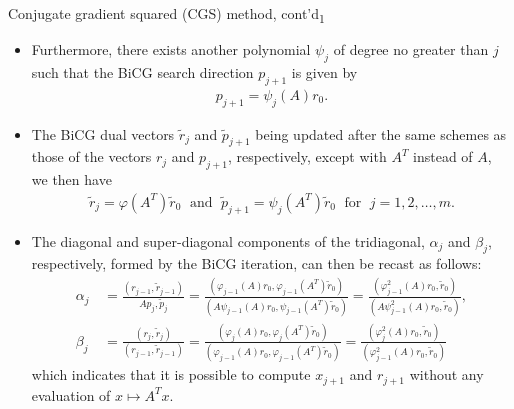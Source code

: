 \documentclass[t,usepdftitle=false]{beamer}
\begin{document}
\begin{frame}{Conjugate gradient squared (CGS) method, cont'd\textsubscript{1}}
\begin{itemize}
\item Furthermore, there exists another polynomial $\psi_j$ of degree no greater than $j$ such that the BiCG search direction $p_{j+1}$ is given by\vspace{-.1cm}
\begin{align*}
p_{j+1}=\psi_j(A)r_0.
\end{align*}
\item The BiCG dual vectors $\tilde{r}_j$ and $\tilde{p}_{j+1}$ being updated after the same schemes as those of the vectors $r_j$ and $p_{j+1}$, respectively, except with $A^T$ instead of $A$, we then have\vspace{-.1cm}
\begin{align*}
\tilde{r}_j=\varphi(A^T)\tilde{r}_0
\;\text{ and }\;
\tilde{p}_{j+1}=\psi_j(A^T)\tilde{r}_0
\;\text{ for }\;
j=1,2,\dots,m.
\end{align*}
\item The diagonal and super-diagonal components of the tridiagonal, $\alpha_j$ and $\beta_j$, respectively, formed by the BiCG iteration, can then be recast as follows:\vspace{-.1cm}
\begin{align*}
\alpha_j&\,=
\frac{(r_{j-1},\tilde{r}_{j-1})}{Ap_j,\tilde{p}_j}=
\frac{(\varphi_{j-1}(A)r_0,\varphi_{j-1}(A^T)\tilde{r}_0)}{(A\psi_{j-1}(A)r_0,\psi_{j-1}(A^T)\tilde{r}_0)}=
\frac{(\varphi_{j-1}^2(A)r_0,\tilde{r}_0)}{(A\psi_{j-1}^2(A)r_0,\tilde{r}_0)},\\
\beta_j&\,=\frac{(r_j,\tilde{r}_j)}{(r_{j-1},\tilde{r}_{j-1})}=
\frac{(\varphi_{j}(A)r_0,\varphi_{j}(A^T)\tilde{r}_0)}{(\varphi_{j-1}(A)r_0,\varphi_{j-1}(A^T)\tilde{r}_0)}=
\frac{(\varphi_{j}^2(A)r_0,\tilde{r}_0)}{(\varphi_{j-1}^2(A)r_0,\tilde{r}_0)}
\end{align*}
which indicates that it is possible to compute $x_{j+1}$ and $r_{j+1}$ without any evaluation of $x\mapsto A^Tx$.
\end{itemize}
\end{frame}
\end{document}
